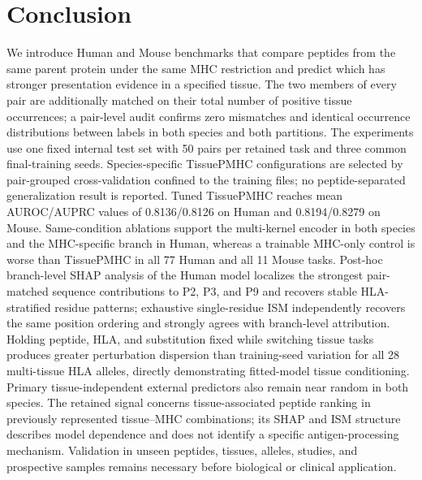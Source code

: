 \section{Conclusion}
We introduce Human and Mouse benchmarks that compare peptides from the same parent protein under the same MHC restriction and predict which has stronger presentation evidence in a specified tissue. The two members of every pair are additionally matched on their total number of positive tissue occurrences; a pair-level audit confirms zero mismatches and identical occurrence distributions between labels in both species and both partitions. The experiments use one fixed internal test set with 50 pairs per retained task and three common final-training seeds. Species-specific TissuePMHC configurations are selected by pair-grouped cross-validation confined to the training files; no peptide-separated generalization result is reported. Tuned TissuePMHC reaches mean AUROC/AUPRC values of 0.8136/0.8126 on Human and 0.8194/0.8279 on Mouse. Same-condition ablations support the multi-kernel encoder in both species and the MHC-specific branch in Human, whereas a trainable MHC-only control is worse than TissuePMHC in all 77 Human and all 11 Mouse tasks. Post-hoc branch-level SHAP analysis of the Human model localizes the strongest pair-matched sequence contributions to P2, P3, and P9 and recovers stable HLA-stratified residue patterns; exhaustive single-residue ISM independently recovers the same position ordering and strongly agrees with branch-level attribution. Holding peptide, HLA, and substitution fixed while switching tissue tasks produces greater perturbation dispersion than training-seed variation for all 28 multi-tissue HLA alleles, directly demonstrating fitted-model tissue conditioning. Primary tissue-independent external predictors also remain near random in both species. The retained signal concerns tissue-associated peptide ranking in previously represented tissue--MHC combinations; its SHAP and ISM structure describes model dependence and does not identify a specific antigen-processing mechanism. Validation in unseen peptides, tissues, alleles, studies, and prospective samples remains necessary before biological or clinical application.
